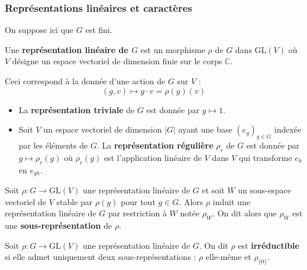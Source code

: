 	\subsubsection{Représentations linéaires et caractères}

	On suppose ici que $G$ est fini.


	\begin{definition}
		Une \textbf{représentation linéaire de $G$} est un morphisme $\rho$ de $G$ dans $\mathrm{GL}(V)$ où $V$ désigne un espace vectoriel de dimension finie sur le corps $\mathbb{C}$.
	\end{definition}


	\begin{remark}
		Ceci correspond à la donnée d'une action de $G$ sur $V$ :
		\[ (g, v) \mapsto g \cdot v = \rho(g)(v) \]
	\end{remark}


	\begin{example}
		\begin{itemize}
			\item La \textbf{représentation triviale} de $G$ est donnée par $g \mapsto 1$.
			\item Soit $V$ un espace vectoriel de dimension $|G|$ ayant une base $(e_g)_{g \in G}$ indexée par les éléments de $G$. La \textbf{représentation régulière} $\rho_r$ de $G$ est donnée par $g \mapsto \rho_r(g)$ où $\rho_r(g)$ est l'application linéaire de $V$ dans $V$ qui transforme $e_h$ en $e_{gh}$.
		\end{itemize}
	\end{example}

	\begin{definition}
		Soit $\rho : G \rightarrow \mathrm{GL}(V)$ une représentation linéaire de $G$ et soit $W$ un sous-espace vectoriel de $V$ stable par $\rho(g)$ pour tout $g \in G$. Alors $\rho$ induit une représentation linéaire de $G$ par restriction à $W$ notée $\rho_W$. On dit alors que $\rho_W$ est une \textbf{sous-représentation} de $\rho$.
	\end{definition}


	\begin{definition}
		Soit $\rho : G \rightarrow \mathrm{GL}(V)$ une représentation linéaire de $G$. On dit $\rho$ est \textbf{irréductible} si elle admet uniquement deux sous-représentations : $\rho$ elle-même et $\rho_{\{ 0 \}}$.
	\end{definition}

